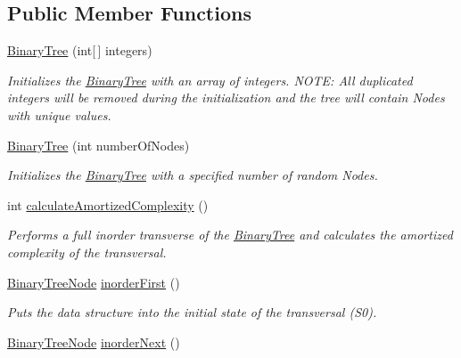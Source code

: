 \subsection*{Public Member Functions}
\begin{DoxyCompactItemize}
\item 
\hyperlink{class_binary_tree_amortized_analyis_1_1_binary_tree_a47eb542ded4a15b94e5f4ae02c0a96b8}{Binary\+Tree} (int\mbox{[}$\,$\mbox{]} integers)
\begin{DoxyCompactList}\small\item\em Initializes the \hyperlink{class_binary_tree_amortized_analyis_1_1_binary_tree}{Binary\+Tree} with an array of integers. N\+O\+TE\+: All duplicated integers will be removed during the initialization and the tree will contain Nodes with unique values. \end{DoxyCompactList}\item 
\hyperlink{class_binary_tree_amortized_analyis_1_1_binary_tree_a079ac3f7742ce2902a6a6793f47d5651}{Binary\+Tree} (int number\+Of\+Nodes)
\begin{DoxyCompactList}\small\item\em Initializes the \hyperlink{class_binary_tree_amortized_analyis_1_1_binary_tree}{Binary\+Tree} with a specified number of random Nodes. \end{DoxyCompactList}\item 
int \hyperlink{class_binary_tree_amortized_analyis_1_1_binary_tree_a0b33bd438f7fd259523e19dda366b443}{calculate\+Amortized\+Complexity} ()
\begin{DoxyCompactList}\small\item\em Performs a full inorder transverse of the \hyperlink{class_binary_tree_amortized_analyis_1_1_binary_tree}{Binary\+Tree} and calculates the amortized complexity of the transversal. \end{DoxyCompactList}\item 
\hyperlink{class_binary_tree_amortized_analyis_1_1_binary_tree_node}{Binary\+Tree\+Node} \hyperlink{class_binary_tree_amortized_analyis_1_1_binary_tree_ad11655dc762ecf73b22c2a61ddbc68c8}{inorder\+First} ()
\begin{DoxyCompactList}\small\item\em Puts the data structure into the initial state of the transversal (S0). \end{DoxyCompactList}\item 
\hyperlink{class_binary_tree_amortized_analyis_1_1_binary_tree_node}{Binary\+Tree\+Node} \hyperlink{class_binary_tree_amortized_analyis_1_1_binary_tree_a8e5b691d35d622254d242ffb611f0cf3}{inorder\+Next} ()

\end{DoxyCompactItemize}
